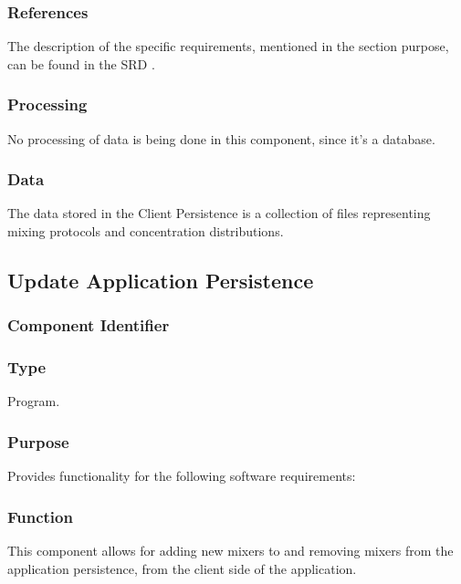 \subsubsection*{References}
The description of the specific requirements, mentioned in the section purpose, can be found in the SRD \cite{srd}.

\subsubsection*{Processing}
No processing of data is being done in this component, since it's a database.

\subsubsection*{Data}
The data stored in the Client Persistence is a collection of files representing mixing protocols and concentration distributions.

\subsection{Update Application Persistence}

\subsubsection*{Component Identifier}
\RTMCUAP{}

\subsubsection*{Type}
Program.

\subsubsection*{Purpose}
Provides functionality for the following software requirements:

\noindent {}

\subsubsection*{Function}
This component allows for adding new mixers to and removing mixers from the application persistence, from the client side of the application.

